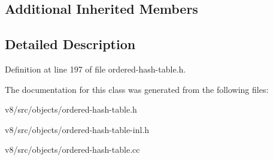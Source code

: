 \subsection*{Additional Inherited Members}


\subsection{Detailed Description}


Definition at line 197 of file ordered-\/hash-\/table.\+h.



The documentation for this class was generated from the following files\+:\begin{DoxyCompactItemize}
\item 
v8/src/objects/ordered-\/hash-\/table.\+h\item 
v8/src/objects/ordered-\/hash-\/table-\/inl.\+h\item 
v8/src/objects/ordered-\/hash-\/table.\+cc\end{DoxyCompactItemize}
